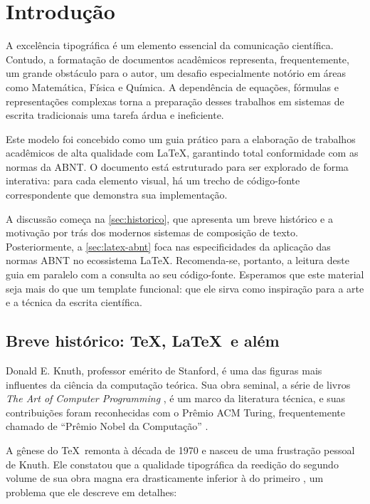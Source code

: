 \chapter{Introdução} \label{chap:intro}

A excelência tipográfica é um elemento essencial da comunicação científica. Contudo, a formatação de documentos acadêmicos representa, frequentemente, um grande obstáculo para o autor, um desafio especialmente notório em áreas como Matemática, Física e Química. A dependência de equações, fórmulas e representações complexas torna a preparação desses trabalhos em sistemas de escrita tradicionais uma tarefa árdua e ineficiente.

Este modelo foi concebido como um guia prático para a elaboração de trabalhos acadêmicos de alta qualidade com \LaTeX, garantindo total conformidade com as normas da ABNT. O documento está estruturado para ser explorado de forma interativa: para cada elemento visual, há um trecho de código-fonte correspondente que demonstra sua implementação.

A discussão começa na \autoref{sec:historico}, que apresenta um breve histórico e a motivação por trás dos modernos sistemas de composição de texto. Posteriormente, a \autoref{sec:latex-abnt} foca nas especificidades da aplicação das normas ABNT no ecossistema \LaTeX. Recomenda-se, portanto, a leitura deste guia em paralelo com a consulta ao seu código-fonte. Esperamos que este material seja mais do que um template funcional: que ele sirva como inspiração para a arte e a técnica da escrita científica.

\section{Breve histórico: \TeX, \LaTeX\ e além} \label{sec:historico}

Donald E. Knuth, professor emérito de Stanford, é uma das figuras mais influentes da ciência da computação teórica. Sua obra seminal, a série de livros \emph{The Art of Computer Programming} \cite{Knuth-TAOCP}, é um marco da literatura técnica, e suas contribuições foram reconhecidas com o Prêmio ACM Turing, frequentemente chamado de ``Prêmio Nobel da Computação'' \cite{KnuthTuring1974}.

A gênese do \TeX\ remonta à década de 1970 e nasceu de uma frustração pessoal de Knuth. Ele constatou que a qualidade tipográfica da reedição do segundo volume de sua obra magna \cite{Knuth-TAOCP-2} era drasticamente inferior à do primeiro \cite{Knuth-TAOCP-1}, um problema que ele descreve em detalhes:

